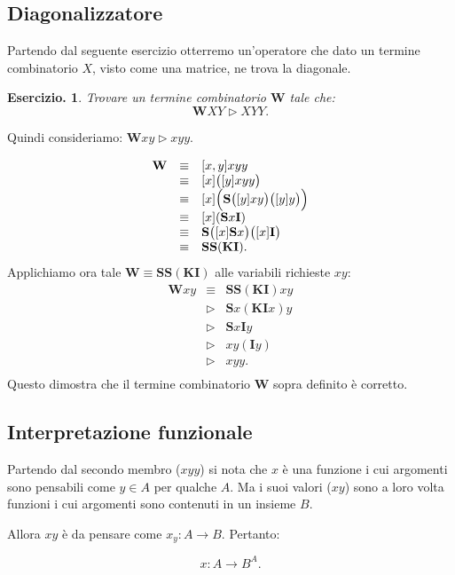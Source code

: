\documentclass{book}
\newtheorem{ese}{Esercizio.}
\newcommand*{\ii}{\mathbf{I}}    %
\newcommand*{\kk}{\mathbf{K}}    %
\newcommand*{\sss}{\mathbf{S}}   %
\newcommand*{\ww}{\mathbf{W}}    %
\begin{document}
\subsection{Diagonalizzatore}
Partendo dal seguente esercizio otterremo un'operatore che dato un termine 
combinatorio $X$, visto come una matrice, ne trova la diagonale.

\begin{ese}
Trovare un termine combinatorio $\ww$ tale che:
\[
\ww XY \vartriangleright XYY.
\]
\end{ese}
Quindi consideriamo: $\ww xy \vartriangleright xyy$.

\[
\begin{array}{lcl}
  \ww & \equiv & [x,y]xyy \\
   & \equiv & [x]\bigl([y]xyy\bigr) \\
   & \equiv & [x]\Bigl(\sss \bigl([y]xy\bigr)\bigl([y]y\bigr)\Bigr) \\
   & \equiv & [x](\sss x\ii) \\
   & \equiv & \sss\bigl([x]\sss x\bigr)\bigl([x]\ii \bigr) \\
   & \equiv & \sss\sss (\kk \ii). \\
\end{array}
\]
Applichiamo ora tale $\ww \equiv \sss\sss (\kk \ii)$ alle variabili richieste 
$xy$:
\[
\begin{array}{lcl}
\ww xy & \equiv &  \sss\sss (\kk \ii)xy \\
    & \vartriangleright & \sss x(\kk \ii x)y \\
    & \vartriangleright & \sss x\ii y\\
    & \vartriangleright &  xy(\ii y)\\
    & \vartriangleright &  xyy.\\
\end{array}
\]
Questo dimostra che il termine combinatorio $\ww$ sopra definito \`e corretto.

\subsection{Interpretazione funzionale}
Partendo dal secondo membro ($xyy$) si nota che $x$ \`e una funzione i cui 
argomenti sono pensabili come $y \in A$ per qualche $A$. Ma i suoi valori 
($xy$) sono a loro volta funzioni i cui argomenti sono contenuti in un insieme 
$B$. 

Allora $xy$ \`e da pensare come $x_y\colon A \to B$.
Pertanto:

$$x\colon A \to B^A.$$
\end{document}
